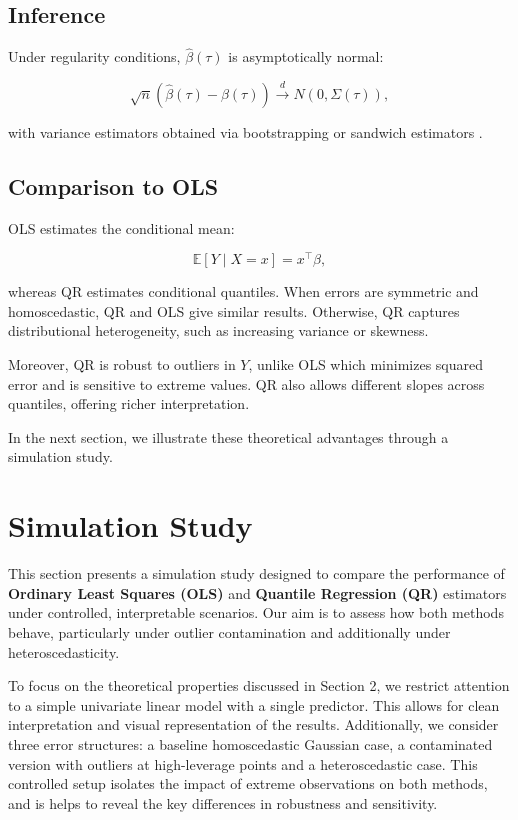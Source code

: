 \documentclass[fleqn,10pt]{latex/stylish_article} %
\begin{document}
\subsection{Inference}\label{inference}

Under regularity conditions, \(\hat\beta(\tau)\) is asymptotically normal:

\[
\sqrt{n}(\hat\beta(\tau) - \beta(\tau)) \overset{d}{\to} N(0, \Sigma(\tau)),
\]

with variance estimators obtained via bootstrapping or sandwich estimators \citep{Koenker2005}.

\subsection{Comparison to OLS}\label{comparison-to-ols}

OLS estimates the conditional mean:

\[
\mathbb{E}[Y \mid X = x] = x^\top \beta,
\]

whereas QR estimates conditional quantiles. When errors are symmetric and homoscedastic, QR and OLS give similar results. Otherwise, QR captures distributional heterogeneity, such as increasing variance or skewness.

Moreover, QR is robust to outliers in \(Y\), unlike OLS which minimizes squared error and is sensitive to extreme values. QR also allows different slopes across quantiles, offering richer interpretation.

In the next section, we illustrate these theoretical advantages through a simulation study.

\section{Simulation Study}\label{simulation-study}

This section presents a simulation study designed to compare the performance of \textbf{Ordinary Least Squares (OLS)} and \textbf{Quantile Regression (QR)} estimators under controlled, interpretable scenarios. Our aim is to assess how both methods behave, particularly under outlier contamination and additionally under heteroscedasticity.

To focus on the theoretical properties discussed in Section 2, we restrict attention to a simple univariate linear model with a single predictor. This allows for clean interpretation and visual representation of the results. Additionally, we consider three error structures: a baseline homoscedastic Gaussian case, a contaminated version with outliers at high-leverage points and a heteroscedastic case. This controlled setup isolates the impact of extreme observations on both methods, and is helps to reveal the key differences in robustness and sensitivity.
\end{document}
